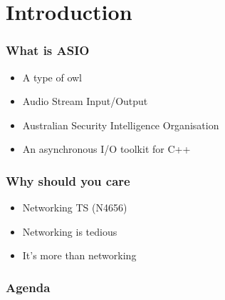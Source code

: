 \section*{Introduction}

\begin{frame}
  \frametitle{What is ASIO}\pause{}
  \begin{itemize}
    \item{A type of owl}\pause{}
    \item{Audio Stream Input/Output}\pause{}
    \item{Australian Security Intelligence Organisation}\pause{}
    \item{An asynchronous I/O toolkit for C++}
  \end{itemize}
\end{frame}

\begin{frame}
  \frametitle{Why should you care}
  \begin{itemize}
    \item{Networking TS (N4656)}\pause{}
    \item{Networking is tedious}\pause{}
    \item{It's more than networking}
  \end{itemize}
\end{frame}

\begin{frame}
  \frametitle{Agenda}
  \tableofcontents
\end{frame}
